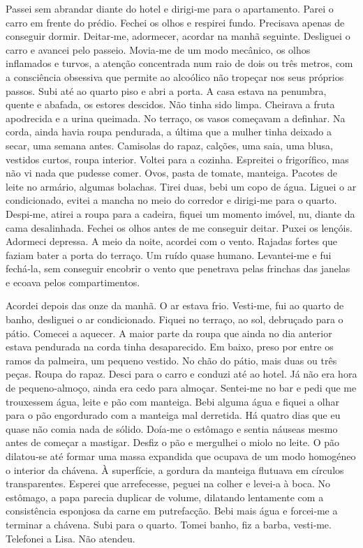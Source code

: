 Passei sem abrandar diante do hotel e dirigi­‑me para o apartamento.
Parei o carro em frente do prédio. Fechei os olhos e respirei fundo.
Precisava apenas de conseguir dormir. Deitar­‑me, adormecer, acordar na
manhã seguinte. Desliguei o carro e avancei pelo passeio. Movia­‑me de
um modo mecânico, os olhos inflamados e turvos, a atenção concentrada
num raio de dois ou três metros, com a consciência obsessiva que permite
ao alcoólico não tropeçar nos seus próprios passos. Subi até ao quarto
piso e abri a porta. A casa estava na penumbra, quente e abafada, os
estores descidos. Não tinha sido limpa. Cheirava a fruta apodrecida e a
urina queimada. No terraço, os vasos começavam a definhar. Na corda,
ainda havia roupa pendurada, a última que a mulher tinha deixado a
secar, uma semana antes. Camisolas do rapaz, calções, uma saia, uma
blusa, vestidos curtos, roupa interior. Voltei para a cozinha. Espreitei
o frigorífico, mas não vi nada que pudesse comer. Ovos, pasta de tomate,
manteiga. Pacotes de leite no armário, algumas bolachas. Tirei duas,
bebi um copo de água. Liguei o ar condicionado, evitei a mancha no meio
do corredor e dirigi­‑me para o quarto. Despi­‑me, atirei a roupa para a
cadeira, fiquei um momento imóvel, nu, diante da cama desalinhada.
Fechei os olhos antes de me conseguir deitar. Puxei os lençóis. Adormeci
depressa. A meio da noite, acordei com o vento. Rajadas fortes que
faziam bater a porta do terraço. Um ruído quase humano. Levantei­‑me e
fui fechá­‑la, sem conseguir encobrir o vento que penetrava pelas
frinchas das janelas e ecoava pelos compartimentos.

Acordei depois das onze da manhã. O ar estava frio. Vesti­‑me, fui ao
quarto de banho, desliguei o ar condicionado. Fiquei no terraço, ao sol,
debruçado para o pátio. Comecei a aquecer. A maior parte da roupa que
ainda no dia anterior estava pendurada na corda tinha desaparecido. Em
baixo, preso por entre os ramos da palmeira, um pequeno vestido. No chão
do pátio, mais duas ou três peças. Roupa do rapaz. Desci para o carro e
conduzi até ao hotel. Já não era hora de pequeno­‑almoço, ainda era cedo
para almoçar. Sentei­‑me no bar e pedi que me trouxessem água, leite e
pão com manteiga. Bebi alguma água e fiquei a olhar para o pão
engordurado com a manteiga mal derretida. Há quatro dias que eu quase
não comia nada de sólido. Doía­‑me o estômago e sentia náuseas mesmo
antes de começar a mastigar. Desfiz o pão e mergulhei o miolo no leite.
O pão dilatou­‑se até formar uma massa expandida que ocupava de um modo
homogéneo o interior da chávena. À superfície, a gordura da manteiga
flutuava em círculos transparentes. Esperei que arrefecesse, peguei na
colher e levei­‑a à boca. No estômago, a papa parecia duplicar de
volume, dilatando lentamente com a consistência esponjosa da carne em
putrefacção. Bebi mais água e forcei­‑me a terminar a chávena. Subi para
o quarto. Tomei banho, fiz a barba, vesti­‑me. Telefonei a Lisa. Não
atendeu.

